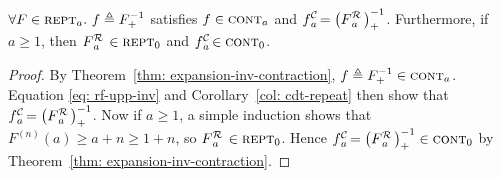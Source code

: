 \begin{thm} \label{thm: cdt-inv-rf}
	$\forall F\in \text{\scshape{rept}}_a.~f\triangleq F^{-1}_+$ satisfies $f \in \text{\scshape{cont}}_{a}$ and $\displaystyle \cdt{f}{a} \ = \left(\rf{F}{a}\ \right)^{-1}_+$. Furthermore, if $a\ge 1$, then $\rf{F}{a}\ \in \repeatable_0$ and $\cdt{f}{a}\ \in \contract_0$.
\end{thm}
\begin{proof}
	By Theorem~\ref{thm: expansion-inv-contraction}, $f\triangleq F^{-1}_+ \in \text{\scshape{cont}}_a$.
	Equation \ref{eq: rf-upp-inv} and Corollary~\ref{col: cdt-repeat}
	then show that $\cdt{f}{a}\ = \left(\rf{F}{a}\ \right)^{-1}_+$.
	Now if $a\ge 1$, a simple induction shows that $F^{(n)}(a)\ge a + n\ge 1 + n$, so $\rf{F}{a}\ \in \repeatable_0$. Hence $\cdt{f}{a} \ = \left(\rf{F}{a}\ \right)^{-1}_+ \in \contract_0$ by Theorem~\ref{thm: expansion-inv-contraction}.
\end{proof}

